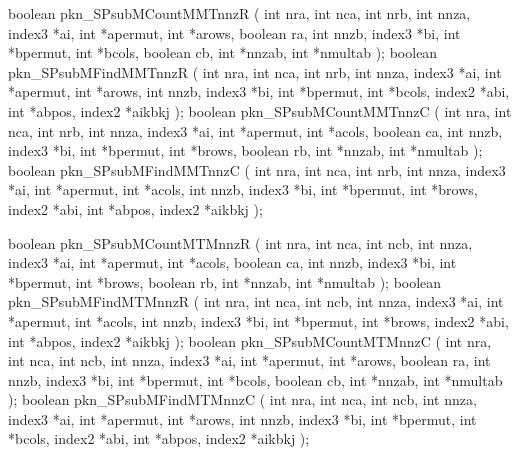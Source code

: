 \begin{listingC}
boolean pkn_SPsubMCountMMTnnzR ( int nra, int nca, int nrb,
                                 int nnza, index3 *ai,
                                 int *apermut, int *arows, boolean ra,
                                 int nnzb, index3 *bi,
                                 int *bpermut, int *bcols, boolean cb,
                                 int *nnzab, int *nmultab );
boolean pkn_SPsubMFindMMTnnzR ( int nra, int nca, int nrb,  
                                int nnza, index3 *ai, int *apermut, int *arows,
                                int nnzb, index3 *bi, int *bpermut, int *bcols,
                                index2 *abi, int *abpos, index2 *aikbkj );
boolean pkn_SPsubMCountMMTnnzC ( int nra, int nca, int nrb,
                                 int nnza, index3 *ai,
                                 int *apermut, int *acols, boolean ca,
                                 int nnzb, index3 *bi,
                                 int *bpermut, int *brows, boolean rb,
                                 int *nnzab, int *nmultab );
boolean pkn_SPsubMFindMMTnnzC ( int nra, int nca, int nrb,  
                                int nnza, index3 *ai, int *apermut, int *acols,
                                int nnzb, index3 *bi, int *bpermut, int *brows,
                                index2 *abi, int *abpos, index2 *aikbkj );
\end{listingC}

\begin{listingC}
boolean pkn_SPsubMCountMTMnnzR ( int nra, int nca, int ncb,
                                 int nnza, index3 *ai,
                                 int *apermut, int *acols, boolean ca,
                                 int nnzb, index3 *bi,
                                 int *bpermut, int *brows, boolean rb,
                                 int *nnzab, int *nmultab );
boolean pkn_SPsubMFindMTMnnzR ( int nra, int nca, int ncb,  
                                int nnza, index3 *ai, int *apermut, int *acols,
                                int nnzb, index3 *bi, int *bpermut, int *brows,
                                index2 *abi, int *abpos, index2 *aikbkj );
boolean pkn_SPsubMCountMTMnnzC ( int nra, int nca, int ncb,
                                 int nnza, index3 *ai,
                                 int *apermut, int *arows, boolean ra,
                                 int nnzb, index3 *bi,
                                 int *bpermut, int *bcols, boolean cb,
                                 int *nnzab, int *nmultab );
boolean pkn_SPsubMFindMTMnnzC ( int nra, int nca, int ncb,  
                                int nnza, index3 *ai, int *apermut, int *arows,
                                int nnzb, index3 *bi, int *bpermut, int *bcols,
                                index2 *abi, int *abpos, index2 *aikbkj );
\end{listingC}

